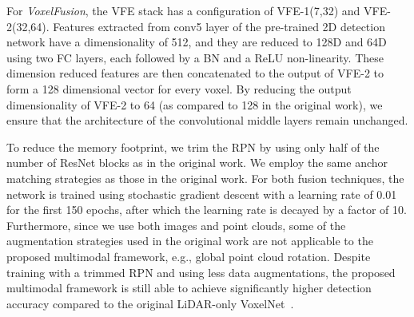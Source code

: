 \documentclass[letterpaper, 10 pt, conference]{ieeeconf}
\newcommand{\VF}{\textit{VoxelFusion}}
\begin{document}
For \VF, the VFE stack has a configuration of VFE-1(7,32) and VFE-2(32,64). Features extracted from conv5 layer of the pre-trained 2D detection network have a dimensionality of 512, and they are reduced to 128D and 64D using two FC layers, each followed by a BN and a ReLU non-linearity. These dimension reduced features are then concatenated to the output of VFE-2 to form a 128 dimensional vector for every voxel. By reducing the output dimensionality of VFE-2 to 64 (as compared to 128 in the original work), we ensure that the architecture of the convolutional middle layers remain unchanged. 

To reduce the memory footprint, we trim the RPN by using only half of the number of ResNet blocks as in the original work. We employ the same anchor matching strategies as those in the original work. For both fusion techniques, the network is trained using stochastic gradient descent with a learning rate of 0.01 for the first 150 epochs, after which the learning rate is decayed by a factor of 10. Furthermore, since we use both images and point clouds, some of the augmentation strategies used in the original work are not applicable to the proposed multimodal framework, e.g., global point cloud rotation. Despite training with a trimmed RPN and using less data augmentations, the proposed multimodal framework is still able to achieve significantly higher detection accuracy compared to the original LiDAR-only VoxelNet~\cite{REF:zhou2017voxelnet}.
\end{document}
